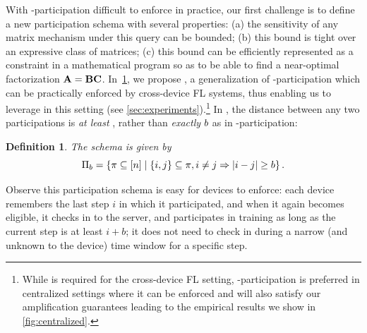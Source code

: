 \documentclass{article}
\newtheorem{definition}{Definition}
\begin{document}
With \multiepoch-participation difficult to enforce in practice, our first challenge is to define a new participation schema with several properties: (a) the sensitivity of any matrix mechanism under this query can be bounded; (b) this bound is tight over an expressive class of matrices; (c) this bound can be efficiently represented as a constraint in a mathematical program so as to be able to find a near-optimal factorization $\mathbf{A} = \mathbf{B} \mathbf{C}$.
%
In~\cref{def:bparticipation}, we propose \bparticipation, a generalization of \multiepoch-participation which can be practically enforced by cross-device FL systems, thus enabling us to leverage \BANDMF in this setting (see \cref{sec:experiments}).\footnote{While \bparticipation is required for the cross-device FL setting, \multiepoch-participation is preferred in centralized settings where it can be enforced and will also satisfy our \BANDMF amplification guarantees leading to the empirical results we show in \cref{fig:centralized}.} %
In \bparticipation, the distance between any two participations is \emph{at least} \minsep, rather than \emph{exactly} $b$ as in \multiepoch-participation:
\begin{definition}\label{def:bparticipation}
The \textbf{\bparticipation} schema is given by
\[
  \Pi_{b} = \left\{\pi \subseteq [n]  \mid \{i, j\} \subseteq \pi, i \ne j \Rightarrow |i - j| \ge b\right\}.
\]
\end{definition}
Observe this participation schema is easy for devices to enforce: each device remembers the last step $i$ in which it participated, and when it again becomes eligible, it checks in to the server, and participates in training as long as the current step is at least $i + b$; it does not need to check in during a narrow (and unknown to the device) time window for a specific step.
\end{document}
